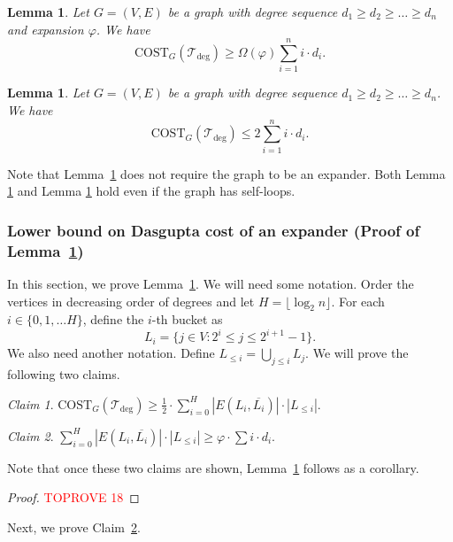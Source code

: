 \documentclass[letterpaper,11pt]{article}
\newcommand{\tdeg}{\mathcal{T}_{\deg}}
\newcommand{\CT}{\text{COST}}
\theoremstyle{plain}
\newtheorem{lemma}[theorem]{Lemma}
\theoremstyle{definition}
\theoremstyle{remark}
\newtheorem{claim}{Claim}
\begin{document}
\begin{lemma} \label{lem:dcost:lb}
	Let $G = (V,E)$ be a graph with degree sequence $d_1 \geq d_2 \geq \ldots \geq d_n$
	and expansion $\varphi$. We have
	$$\CT_G(\tdeg) \geq \Omega(\varphi) \sum_{i=1}^{n} i \cdot d_i \text{.}$$
\end{lemma}

\begin{lemma} \label{lem:dcost:ub}
	Let $G = (V,E)$ be a graph with degree sequence $d_1 \geq d_2 \geq \ldots \geq d_n$. We have
	$$\CT_G(\tdeg) \leq 2 \sum_{i=1}^n i \cdot d_i.$$
\end{lemma}

Note that Lemma~\ref{lem:dcost:ub} does not require the graph to be an expander. Both Lemma \ref{lem:dcost:lb} and Lemma \ref{lem:dcost:ub} hold even if the graph has self-loops.  

\subsubsection{Lower bound on Dasgupta cost of an expander (Proof of Lemma~\ref{lem:dcost:lb})}

In this section, we prove Lemma~\ref{lem:dcost:lb}. We will need some notation. Order the vertices
in decreasing order of degrees and let $H = \lfloor \log_2 n \rfloor$. 
For each $i \in \{0,1, \ldots H\}$, define the $i$-th
bucket as $$L_i = \{j \in V : 2^i \leq j \leq 2^{i+1} - 1 \}.$$ We also need another notation.
Define $L_{\leq i} = \bigcup_{j \leq i} L_j$. We will prove the following two claims.

\begin{claim} \label{clm:lb:aux}
	$\CT_G(\tdeg) \geq \frac{1}{2} \cdot \sum_{i = 0}^{H} |E(L_i, \overline{L_i})| \cdot |L_{\leq i}|$.
\end{claim}


\begin{claim} \label{clm:lb:final}
	$\sum_{i = 0}^{H} |E(L_i, \overline{L_i})| \cdot |L_{\leq i}| \geq \varphi \cdot \sum i \cdot  d_i$.
\end{claim}

Note that once these two claims are shown, Lemma~\ref{lem:dcost:lb} follows as a corollary.




\begin{proof}\textcolor{red}{TOPROVE 18}\end{proof}

Next, we prove Claim~\ref{clm:lb:final}.
\end{document}
